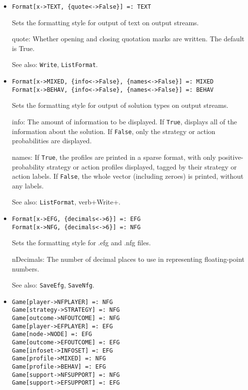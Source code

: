 \begin{itemize}
\item{}
\protect \large \begin{verbatim}
Format[x->TEXT, {quote<->False}] =: TEXT 
\end{verbatim} \normalsize

\bd
Sets the formatting style for output of text on output streams.
\bd
\item [quote:] Whether opening and closing quotation marks are
written.  The default is True.  
\ed
\item [See also:] \verb+Write+, \verb+ListFormat+.
\ed


\item{}
\protect \large \begin{verbatim}
Format[x->MIXED, {info<->False}, {names<->False}] =: MIXED
Format[x->BEHAV, {info<->False}, {names<->False}] =: BEHAV
\end{verbatim} \normalsize

\bd
Sets the formatting style for output of solution types on output streams.
\bd
\item [info:] The amount of information to be displayed.  If \verb+True+,
displays all of the information about the solution.  If \verb+False+,
only the strategy or action probabilities are displayed.
\item [names:] If \verb+True+, the profiles are printed in a sparse format,
with only positive-probability strategy or action profiles displayed, tagged
by their strategy or action labels.  If \verb+False+, the whole vector
(including zeroes) is printed, without any labels.
\ed
\item [See also:] \verb+ListFormat+, verb+Write+.
\ed

\item{}
\protect \large \begin{verbatim}
Format[x->EFG, {decimals<->6}] =: EFG
Format[x->NFG, {decimals<->6}] =: NFG
\end{verbatim} \normalsize

\bd
Sets the formatting style for .efg and .nfg files.
\bd
\item [nDecimals:] The number of decimal places to use in representing
floating-point numbers.
\ed
\item [See also:] \verb+SaveEfg+, \verb+SaveNfg+.
\ed



\item{}
\protect \large \begin{verbatim}
Game[player->NFPLAYER] =: NFG 
Game[strategy->STRATEGY] =: NFG 
Game[outcome->NFOUTCOME] =: NFG 
Game[player->EFPLAYER] =: EFG 
Game[node->NODE] =: EFG 
Game[outcome->EFOUTCOME] =: EFG 
Game[infoset->INFOSET] =: EFG 
Game[profile->MIXED] =: NFG 
Game[profile->BEHAV] =: EFG 
Game[support->NFSUPPORT] =: NFG 
Game[support->EFSUPPORT] =: EFG 
\end{verbatim} \normalsize


\end{itemize}
